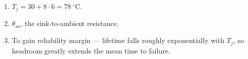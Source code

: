 \begin{enumerate}[leftmargin=1.6em,itemsep=2pt]
\item $T_j = 30 + 8\cdot6 = 78\ ^\circ\text{C}$.
\item $\theta_{sa}$, the sink-to-ambient resistance.
\item To gain reliability margin --- lifetime falls roughly exponentially with $T_j$, so headroom greatly extends the mean time to failure.
\end{enumerate}
